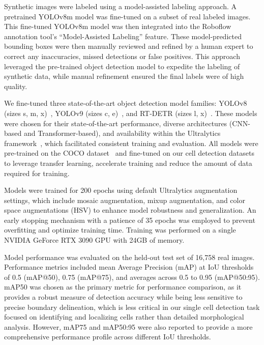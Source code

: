 Synthetic images were labeled using a model-assisted labeling approach.
A pretrained YOLOv8m model was fine-tuned on a subset of real labeled images.
This fine-tuned YOLOv8m model was then integrated into the Roboflow annotation tool's ``Model-Assisted Labeling'' feature.
These model-predicted bounding boxes were then manually reviewed and refined by a human expert to correct any inaccuracies, missed detections or false positives.
This approach leveraged the pre-trained object detection model to expedite the labeling of synthetic data, while manual refinement ensured the final labels were of high quality.

We fine-tuned three state-of-the-art object detection model families: YOLOv8 (sizes s, m, x)~\cite{jocher_ultralytics_2023}, YOLOv9 (sizes c, e)~\cite{Wang2024YOLOv9LW}, and RT-DETR (sizes l, x)~\cite{Lv2023DETRsBY}.
These models were chosen for their state-of-the-art performance, diverse architectures (CNN-based and Transformer-based), and availability within the Ultralytics framework~\cite{jocher_ultralytics_2023}, which facilitated consistent training and evaluation.
All models were pre-trained on the COCO dataset~\cite{tsung-yi_lin_microsoft_2014} and fine-tuned on our cell detection datasets to leverage transfer learning, accelerate training and reduce the amount of data required for training.

Models were trained for 200 epochs using default Ultralytics augmentation settings, which include mosaic augmentation, mixup augmentation, and color space augmentations (HSV) to enhance model robustness and generalization.
An early stopping mechanism with a patience of 35 epochs was employed to prevent overfitting and optimize training time.
Training was performed on a single NVIDIA GeForce RTX 3090 GPU with 24GB of memory.

Model performance was evaluated on the held-out test set of 16,758 real images.
Performance metrics included mean Average Precision (mAP) at IoU thresholds of 0.5 (mAP@50), 0.75 (mAP@75), and averages across 0.5 to 0.95 (mAP@50:95).
mAP\@50 was chosen as the primary metric for performance comparison, as it provides a robust measure of detection accuracy while being less sensitive to precise boundary delineation, which is less critical in our single cell detection task focused on identifying and localizing cells rather than detailed morphological analysis.
However, mAP\@75 and mAP\@50:95 were also reported to provide a more comprehensive performance profile across different IoU thresholds.

